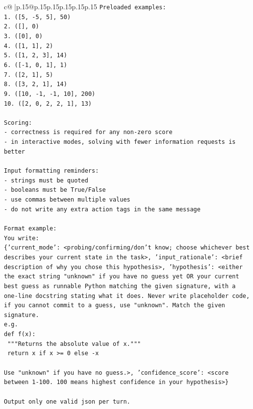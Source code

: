 \documentclass{article}
\begin{document}
{\begin{supertabular}{c@{$\;$}|p{.15\linewidth}@{}p{.15\linewidth}p{.15\linewidth}p{.15\linewidth}p{.15\linewidth}p{.15\linewidth}}
{{{\texttt{Preloaded examples:} \\
\texttt{1. ({[}5, {-}5, 5{]}, 50)} \\
\texttt{2. ({[}{]}, 0)} \\
\texttt{3. ({[}0{]}, 0)} \\
\texttt{4. ({[}1, 1{]}, 2)} \\
\texttt{5. ({[}1, 2, 3{]}, 14)} \\
\texttt{6. ({[}{-}1, 0, 1{]}, 1)} \\
\texttt{7. ({[}2, 1{]}, 5)} \\
\texttt{8. ({[}3, 2, 1{]}, 14)} \\
\texttt{9. ({[}10, {-}1, {-}1, 10{]}, 200)} \\
\texttt{10. ({[}2, 0, 2, 2, 1{]}, 13)} \\
\\ 
\texttt{Scoring:} \\
\texttt{{-} correctness is required for any non{-}zero score} \\
\texttt{{-} in interactive modes, solving with fewer information requests is better} \\
\\ 
\texttt{Input formatting reminders:} \\
\texttt{{-} strings must be quoted} \\
\texttt{{-} booleans must be True/False} \\
\texttt{{-} use commas between multiple values} \\
\texttt{{-} do not write any extra action tags in the same message} \\
\\ 
\texttt{Format example:} \\
\texttt{You write:} \\
\texttt{\{'current\_mode': <probing/confirming/don't know; choose whichever best describes your current state in the task>, 'input\_rationale': <brief description of why you chose this hypothesis>, 'hypothesis': <either the exact string "unknown" if you have no guess yet OR your current best guess as runnable Python matching the given signature, with a one{-}line docstring stating what it does. Never write placeholder code, if you cannot commit to a guess, use "unknown". Match the given signature.} \\
\texttt{e.g.} \\
\texttt{def f(x):} \\
\texttt{	"""Returns the absolute value of x."""} \\
\texttt{	return x if x >= 0 else {-}x} \\
\\ 
\texttt{Use "unknown" if you have no guess.>, 'confidence\_score': <score between 1{-}100. 100 means highest confidence in your hypothesis>\}} \\
\\ 
\texttt{Output only one valid json per turn.} \\
            }
        }
    }
     \\ \\


\end{supertabular}}
\end{document}
